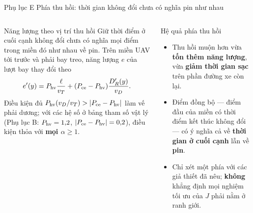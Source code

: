 \documentclass[aspectratio=169,10pt,t,xcolor={table}]{beamer}
\newcommand{\apptitle}[2]{Phụ lục #1 \textperiodcentered{} #2}
\begin{document}
\begin{frame}{\apptitle{E}{Phía thu hồi: thời gian không đổi chưa có nghĩa pin như nhau}}
\begin{columns}[T,onlytextwidth]
\begin{block}{Năng lượng theo vị trí thu hồi}
\footnotesize Giữ thời điểm ở cuối cạnh không đổi chưa có nghĩa mọi điểm trong miền đó như nhau về pin. Trên miền UAV tới trước và phải bay treo, năng lượng $e$ của lượt bay thay đổi theo
\[
e'(y)=P_{\rm hv}\frac{\ell}{v_T}+(P_{\rm ce}-P_{\rm hv})\frac{D_R'(y)}{v_D}.
\]
Điều kiện đủ $P_{\rm hv}(v_D/v_T)>|P_{\rm ce}-P_{\rm hv}|$ làm vế phải dương; với các hệ số ở bảng tham số vật lý (Phụ lục B: $P_{\rm hv}=1{,}2$, $|P_{\rm ce}-P_{\rm hv}|=0{,}2$), điều kiện thỏa với \textbf{mọi $\alpha\ge1$}.
\end{block}
\begin{block}{Hệ quả phía thu hồi}
\footnotesize
\begin{itemize}
\item Thu hồi muộn hơn vừa \textbf{tốn thêm năng lượng}, vừa \textbf{giảm thời gian sạc} trên phần đường xe còn lại.
\item Điểm đồng bộ --- điểm đầu của miền có thời điểm kết thúc không đổi --- có ý nghĩa cả về \textbf{thời gian ở cuối cạnh} lẫn về \textbf{pin}.
\item Chỉ xét một phía với các giả thiết đã nêu; \textbf{không} khẳng định mọi nghiệm tối ưu của $J$ phải nằm ở ranh giới.
\end{itemize}
\end{block}
\end{columns}
\end{frame}
\end{document}
